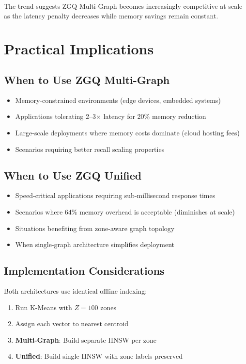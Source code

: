 \documentclass[11pt,a4paper]{article}
\begin{document}
The trend suggests ZGQ Multi-Graph becomes increasingly competitive at scale as the latency penalty decreases while memory savings remain constant.

\section{Practical Implications}

\subsection{When to Use ZGQ Multi-Graph}
\begin{itemize}
    \item Memory-constrained environments (edge devices, embedded systems)
    \item Applications tolerating 2--3× latency for 20\% memory reduction
    \item Large-scale deployments where memory costs dominate (cloud hosting fees)
    \item Scenarios requiring better recall scaling properties
\end{itemize}

\subsection{When to Use ZGQ Unified}
\begin{itemize}
    \item Speed-critical applications requiring sub-millisecond response times
    \item Scenarios where 64\% memory overhead is acceptable (diminishes at scale)
    \item Situations benefiting from zone-aware graph topology
    \item When single-graph architecture simplifies deployment
\end{itemize}

\subsection{Implementation Considerations}

Both architectures use identical offline indexing:
\begin{enumerate}
    \item Run K-Means with $Z=100$ zones
    \item Assign each vector to nearest centroid
    \item \textbf{Multi-Graph}: Build separate HNSW per zone
    \item \textbf{Unified}: Build single HNSW with zone labels preserved
\end{enumerate}
\end{document}
